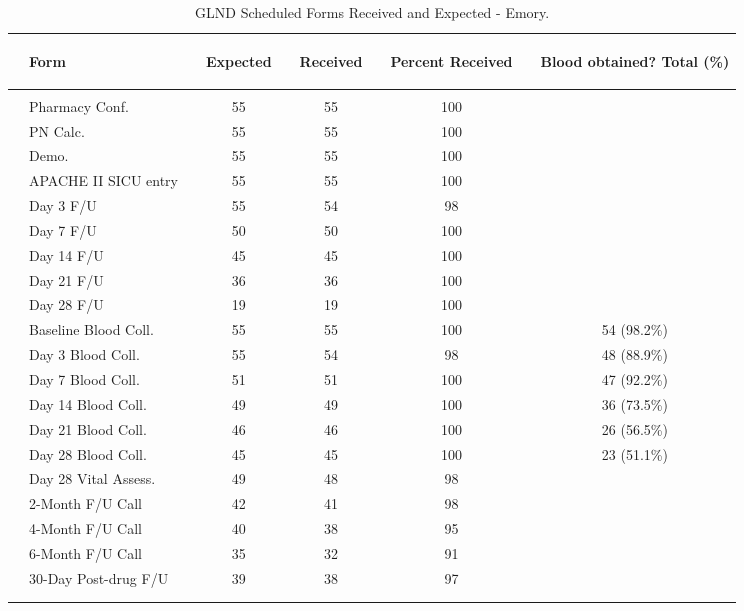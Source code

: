 \documentclass[dvips,10pt]{article}
\begin{document}
\begin{table}[t]
\caption
{ GLND Scheduled Forms Received and Expected - Emory. }
\begin{center}
\begin{tabular}{ @{}l@{}
@{}l@{}@{}p{1.5em}@{}@{}c@{}@{}p{1.5em}@{}@{}c@{}@{}p{1.5em}@{}@{}c@{}@{}p{1.5em}@{}@{}c@{}
}
\hline

& \parbox{6em}{\begin{center}Form\end{center}} && \parbox{6em}{\begin{center}Expected\end{center}} && \parbox{6em}{\begin{center}Received\end{center}} && \parbox{6em}{\begin{center}Percent Received\end{center}} && \parbox{6em}{\begin{center}Blood obtained? Total (\%)\end{center}} \\

\hline

\\
& Pharmacy Conf. && 55 && 55 && 100 &&  \\
& PN Calc. && 55 && 55 && 100 &&  \\
& Demo. && 55 && 55 && 100 &&  \\
& APACHE II SICU entry && 55 && 55 && 100 &&  \\
& Day 3 F/U && 55 && 54 && 98 &&  \\
& Day 7 F/U && 50 && 50 && 100 &&  \\
& Day 14 F/U && 45 && 45 && 100 &&  \\
& Day 21 F/U && 36 && 36 && 100 &&  \\
& Day 28 F/U && 19 && 19 && 100 &&  \\
& Baseline Blood Coll. && 55 && 55 && 100 && 54 (98.2\%) \\
& Day 3 Blood Coll. && 55 && 54 && 98 && 48 (88.9\%) \\
& Day 7 Blood Coll. && 51 && 51 && 100 && 47 (92.2\%) \\
& Day 14 Blood Coll. && 49 && 49 && 100 && 36 (73.5\%) \\
& Day 21 Blood Coll. && 46 && 46 && 100 && 26 (56.5\%) \\
& Day 28 Blood Coll. && 45 && 45 && 100 && 23 (51.1\%) \\
& Day 28 Vital Assess. && 49 && 48 && 98 &&  \\
& 2-Month F/U Call && 42 && 41 && 98 &&  \\
& 4-Month F/U Call && 40 && 38 && 95 &&  \\
& 6-Month F/U Call && 35 && 32 && 91 &&  \\
& 30-Day Post-drug F/U && 39 && 38 && 97 &&  \\
\\
\hline \\

\end{tabular}

\end{center}
 \end{table}
\end{document}
